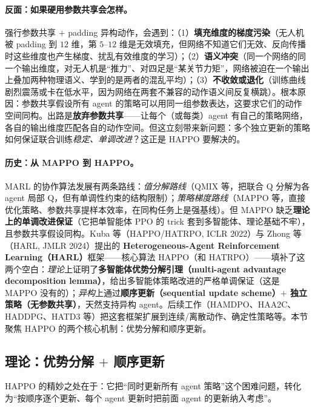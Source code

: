 \paragraph{反面：如果硬用参数共享会怎样。}
强行参数共享 $+$ padding 异构动作，会遇到：（1）\textbf{填充维度的梯度污染}（无人机被 padding 到 $12$ 维，第 $5$--$12$ 维是无效填充，但网络不知道它们无效、反向传播时这些维度也产生梯度、扰乱有效维度的学习）；（2）\textbf{语义冲突}（同一个网络的同一个输出维度，对无人机是“推力”、对四足是“某关节力矩”，网络被迫在一个输出上叠加两种物理语义、学到的是两者的混乱平均）；（3）\textbf{不收敛或退化}（训练曲线剧烈震荡或卡在低水平，因为网络在两套不兼容的动作语义间反复横跳）。根本原因：参数共享假设所有 agent 的策略可以用同一组参数表达，这要求它们的动作空间同构。出路是\textbf{放弃参数共享}——让每个（或每类）agent 有自己的策略网络，各自的输出维度匹配各自的动作空间。但这立刻带来新问题：多个独立更新的策略如何保证联合训练\emph{稳定、单调改进}？这正是 HAPPO 要解决的。

\paragraph{历史：从 MAPPO 到 HAPPO。}
MARL 的协作算法发展有两条路线：\emph{值分解路线}（QMIX 等，把联合 Q 分解为各 agent 局部 Q，但有单调性约束的结构限制）；\emph{策略梯度路线}（MAPPO 等，直接优化策略、参数共享提样本效率，在同构任务上是强基线）。但 MAPPO 缺乏\textbf{理论上的单调改进保证}（它把单智能体 PPO 的 trick 套到多智能体、理论基础不牢），且参数共享假设同构。Kuba 等（HAPPO/HATRPO, ICLR 2022\cite{kuba2022happo}）与 Zhong 等（HARL, JMLR 2024\cite{zhong2024harl}）提出的 \textbf{Heterogeneous-Agent Reinforcement Learning（HARL）}框架——核心算法 HAPPO（和 HATRPO）——填补了这两个空白：\emph{理论}上证明了\textbf{多智能体优势分解引理（multi-agent advantage decomposition lemma）}，给出多智能体策略改进的严格单调保证（这是 MAPPO 没有的）；\emph{异构}上通过\textbf{顺序更新（sequential update scheme）$+$ 独立策略（无参数共享）}，天然支持异构 agent。后续工作（HAMDPO、HAA2C、HADDPG、HATD3 等）把这套框架扩展到连续/离散动作、确定性策略等。本节聚焦 HAPPO 的两个核心机制：优势分解和顺序更新。

\subsection{理论：优势分解 \texorpdfstring{$+$}{+} 顺序更新}
\label{sec:hmr-marl-theory}
HAPPO 的精妙之处在于：它把“同时更新所有 agent 策略”这个困难问题，转化为“按顺序逐个更新、每个 agent 更新时把前面 agent 的更新纳入考虑”。

